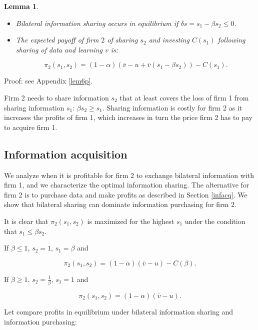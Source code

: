 \documentclass[a4paper,leqno]{article}%
\newtheorem{lemma}{Lemma}
\renewcommand{\a}{\alpha}
\newcommand{\ov}{\overline{v}}
\begin{document}
%

\begin{lemma}~~\label{lem6}

\begin{itemize}
    \item Bilateral information sharing occurs in equilibrium if $\delta s=s_1-\beta s_2\leq0$.
    \item The expected payoff of firm $2$ of sharing $s_2$ and investing $C(s_1)$ following sharing of data and learning $v$ is:

    $$\pi_2(s_1,s_2)=(1-\a)(\ov-u+\ov (s_1-\beta s_2))-C(s_1).$$

\end{itemize} 

\end{lemma}

\medskip

\noindent Proof: see Appendix \ref{lem6p}.

\noindent Firm 2 needs to share information $s_2$ that at least covers the loss of firm 1 from sharing information $s_1$: $\beta s_2\geq s_1$. Sharing information is costly for firm 2 as it increases the profits of firm 1, which increases in turn the price firm 2 has to pay to acquire firm 1. 

\subsection{Information acquisition}

We analyze when it is profitable for firm 2 to exchange bilateral information with firm 1, and we characterize the optimal information sharing. The alternative for firm 2 is to purchase data and make profits as described in Section \ref{infacq}. We show that bilateral sharing can dominate information purchasing for firm $2$. 

\medskip

It is clear that $\pi_2(s_1,s_2)$ is maximized for the highest $s_1$ under the condition that $s_1\leq \beta s_2$. 


If $\beta\leq 1$, $s_2=1$, $s_1=\beta$ and

        $$\pi_2(s_1,s_2)=(1-\a)(\ov-u)-C(\beta).$$

If $\beta\geq 1$, $s_2=\frac{1}{\beta}$, $s_1=1$ and

        $$\pi_2(s_1,s_2)=(1-\a)(\ov-u).$$

\medskip

Let compare profits in equilibrium under bilateral information sharing and information purchasing:
\end{document}
